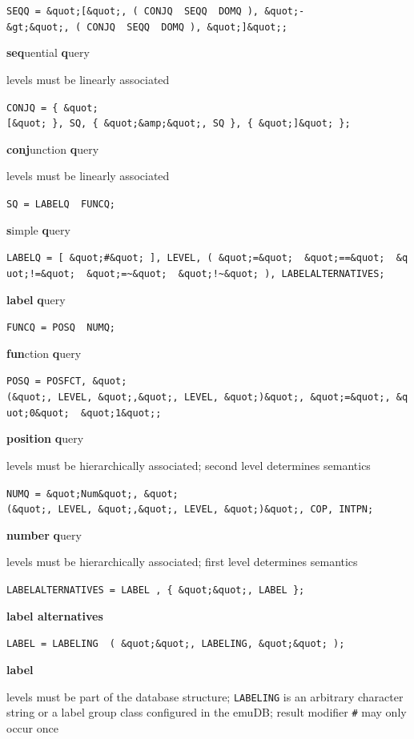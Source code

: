 \documentclass[]{book}
\theoremstyle{definition}
\theoremstyle{definition}
\theoremstyle{definition}
\theoremstyle{remark}
\begin{document}
\texttt{SEQQ\ =\ \&quot;{[}\&quot;,\ (\ CONJQ\ \textbar{}\ SEQQ\ \textbar{}\ DOMQ\ ),\ \&quot;-\&gt;\&quot;,\ (\ CONJQ\ \textbar{}\ SEQQ\ \textbar{}\ DOMQ\ ),\ \&quot;{]}\&quot;;}

\textbf{seq}uential \textbf{q}uery

levels must be linearly associated

\texttt{CONJQ\ =\ \{\ \&quot;{[}\&quot;\ \},\ SQ,\ \{\ \&quot;\&amp;\&quot;,\ SQ\ \},\ \{\ \&quot;{]}\&quot;\ \};}

\textbf{conj}unction \textbf{q}uery

levels must be linearly associated

\texttt{SQ\ =\ LABELQ\ \textbar{}\ FUNCQ;}

\textbf{s}imple \textbf{q}uery

\texttt{LABELQ\ =\ {[}\ \&quot;\#\&quot;\ {]},\ LEVEL,\ (\ \&quot;=\&quot;\ \textbar{}\ \&quot;==\&quot;\ \textbar{}\ \&quot;!=\&quot;\ \textbar{}\ \&quot;=\textasciitilde{}\&quot;\ \textbar{}\ \&quot;!\textasciitilde{}\&quot;\ ),\ LABELALTERNATIVES;}

\textbf{label} \textbf{q}uery

\texttt{FUNCQ\ =\ POSQ\ \textbar{}\ NUMQ;}

\textbf{fun}ction \textbf{q}uery

\texttt{POSQ\ =\ POSFCT,\ \&quot;(\&quot;,\ LEVEL,\ \&quot;,\&quot;,\ LEVEL,\ \&quot;)\&quot;,\ \&quot;=\&quot;,\ \&quot;0\&quot;\ \textbar{}\ \&quot;1\&quot;;}

\textbf{position} \textbf{q}uery

levels must be hierarchically associated; second level determines
semantics

\texttt{NUMQ\ =\ \&quot;Num\&quot;,\ \&quot;(\&quot;,\ LEVEL,\ \&quot;,\&quot;,\ LEVEL,\ \&quot;)\&quot;,\ COP,\ INTPN;}

\textbf{number} \textbf{q}uery

levels must be hierarchically associated; first level determines
semantics

\texttt{LABELALTERNATIVES\ =\ LABEL\ ,\ \{\ \&quot;\textbar{}\&quot;,\ LABEL\ \};}

\textbf{label alternatives}

\texttt{LABEL\ =\ LABELING\ \textbar{}\ (\ \&quot;\textquotesingle{}\&quot;,\ LABELING,\ \&quot;\textquotesingle{}\&quot;\ );}

\textbf{label}

levels must be part of the database structure; \texttt{LABELING} is an
arbitrary character string or a label group class configured in the
emuDB; result modifier \texttt{\#} may only occur once
\end{document}
